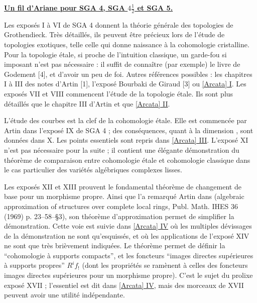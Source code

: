 
\markboth{}{}
\thispagestyle{plain}
{}
\begin{center}
\textbf{\underline{Un fil d'Ariane pour SGA 4, SGA $4\frac12$ et SGA 5.}}
\end{center}
\label{Ariane}

Les exposés I à VI de SGA 4 donnent la théorie générale des topologies de
Grothendieck. Très détaillés, ils peuvent être précieux lors de l'étude de
topologies exotiques, telle celle qui donne naissance à la cohomologie
cristalline. Pour la topologie étale, si proche de l'intuition classique, un
garde-fou si imposant n'est pas nécessaire : il suffit de connaître (par
exemple) le livre de Godement [4], et d'avoir un peu de foi. Autres références
possibles : les chapitres I à III des notes d'Artin [1], l'exposé Bourbaki de
Giraud [3] ou \hyperref[I:1]{[Arcata] I}. Les exposés VII et VIII commencent
l'étude de la topologie étale. Ils sont plus détaillés que le chapitre III
d'Artin et que \hyperref[I:2]{[Arcata] II}.

L'étude des courbes est la clef de la cohomologie étale. Elle est commencée par
Artin dans l'exposé IX de SGA 4 ; des conséquences, quant à la dimension
, sont données dans X. Les points essentiels sont repris dans
\hyperref[I:3]{[Arcata] III}. L'exposé XI n'est pas nécessaire pour la suite ;
il contient une élégante démonstration du théorème de comparaison entre
cohomologie étale et cohomologie classique dans le cas particulier des variétés
algébriques complexes lisses.

Les exposés XII et XIII prouvent le fondamental théorème de changement de base
pour un morphisme propre. Ainsi que l'a remarqué Artin dans (algebraic
approximation of structures over complete local rings, Publ. Math. IHES 36
(1969) p. 23--58--§3), son théorème d'approximation permet de simplifier la
démonstration. Cette voie est suivie dans \hyperref[I:4]{[Arcata] IV} où les
multiples dévissages de la démonstration ne sont qu'esquissés, et où les
applications de l'exposé XIV ne sont que très brièvement indiquées. Le théorème
permet de définir la ``cohomologie à supports compacts'', et les foncteurs
``images directes supérieures à supports propres'' $R^i f_!$ (dont les
propriétés se ramènent à celles des foncteurs images directes supérieures pour
un morphisme propre). C'est le sujet du prolixe exposé XVII ; l'essentiel est
dit dans \hyperref[I:4]{[Arcata] IV}, mais des morceaux de XVII peuvent avoir
une utilité indépendante.

